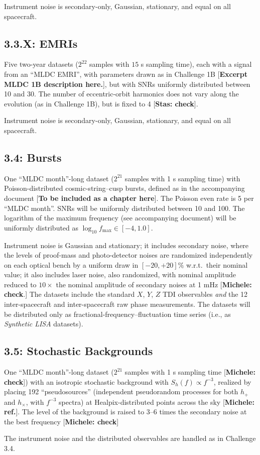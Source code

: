 \documentclass[11pt]{article}
\begin{document}
Instrument noise is secondary-only, Gaussian, stationary, and equal on all spacecraft. 

\subsection*{3.3.X: EMRIs}

Five two-year datasets ($2^{22}$ samples with $15$ s sampling time), each with a signal from an ``MLDC EMRI'', with parameters drawn as in Challenge 1B [\textbf{Excerpt MLDC 1B description here.}], but with SNRs uniformly distributed between 10 and 30. The number of eccentric-orbit harmonics does not vary along the evolution (as in Challenge 1B), but is fixed to 4 [\textbf{Stas: check}].

Instrument noise is secondary-only, Gaussian, stationary, and equal on all spacecraft. 

\subsection*{3.4: Bursts}

One ``MLDC month''-long dataset ($2^{21}$ samples with 1 s sampling time) with Poisson-distributed cosmic-string--cusp bursts, defined as in the accompanying document [\textbf{To be included as a chapter here}]. The Poisson even rate is 5 per ``MLDC month''. SNRs will be uniformly distributed between 10 and 100. The logarithm of the maximum frequency (see accompanying document) will be uniformly distributed as $\log_10 f_\mathrm{max} \in [-4,1.0]$.

Instrument noise is Gaussian and stationary; it includes secondary noise, where the levels of proof-mass and photo-detector noises are randomized independently on each optical bench by a uniform draw in $[-20,+20]\%$ w.r.t.\ their nominal value; it also includes laser noise, also randomized, with nominal amplitude reduced to $10\times$ the nominal amplitude of secondary noises at 1 mHz [\textbf{Michele: check}.] The datasets include the standard $X$, $Y$, $Z$ TDI observables \emph{and} the 12 inter-spacecraft and inter-spacecraft raw phase measurements. The datasets will be distributed only as fractional-frequency--fluctuation time series (i.e., as \emph{Synthetic LISA} datasets).

\subsection*{3.5: Stochastic Backgrounds}

One ``MLDC month''-long dataset ($2^{21}$ samples with 1 s sampling time [\textbf{Michele: check}]) with an isotropic stochastic background with $S_h(f) \propto f^{-3}$, realized by placing 192 ``pseudosources'' (independent pseudorandom processes for both $h_+$ and $h_\times$, with $f^{-3}$ spectra) at Healpix-distributed points across the sky [\textbf{Michele: ref.}]. The level of the background is raised to 3--6 times the secondary noise at the best frequency [\textbf{Michele: check}]

The instrument noise and the distributed observables are handled as in Challenge 3.4.
\end{document}

